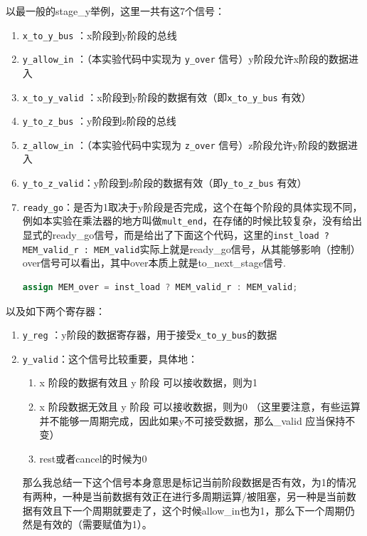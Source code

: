 \documentclass[a4paper]{article}
\begin{document}
以最一般的stage\_y举例，这里一共有这7个信号：
\begin{enumerate}
    \item \texttt{x\_to\_y\_bus} ：x阶段到y阶段的总线
    \item \texttt{y\_allow\_in} ：（本实验代码中实现为 \texttt{y\_over} 信号）y阶段允许x阶段的数据进入
    \item \texttt{x\_to\_y\_valid} ：x阶段到y阶段的数据有效（即\texttt{x\_to\_y\_bus} 有效）
    \item \texttt{y\_to\_z\_bus} ：y阶段到z阶段的总线
    \item \texttt{z\_allow\_in} ：（本实验代码中实现为 \texttt{z\_over} 信号）z阶段允许y阶段的数据进入
    \item \texttt{y\_to\_z\_valid}：y阶段到z阶段的数据有效（即\texttt{y\_to\_z\_bus} 有效）
    \item \texttt{ready\_go}：是否为1取决于y阶段是否完成，这个在每个阶段的具体实现不同，例如本实验在乘法器的地方叫做\texttt{mult\_end}，在存储的时候比较复杂，没有给出显式的ready\_go信号，而是给出了下面这个代码，这里的\texttt{inst\_load ? MEM\_valid\_r : MEM\_valid}实际上就是ready\_go信号，从其能够影响（控制）over信号可以看出，其中over本质上就是to\_next\_stage信号.
    \begin{lstlisting}[language=Verilog]
        assign MEM_over = inst_load ? MEM_valid_r : MEM_valid;
    \end{lstlisting}    
\end{enumerate}
以及如下两个寄存器：
\begin{enumerate}
    \item \texttt{y\_reg} ：y阶段的数据寄存器，用于接受\texttt{x\_to\_y\_bus}的数据
    \item \texttt{y\_valid}：这个信号比较重要，具体地：
    \begin{enumerate}
        \item x 阶段的数据有效且 y 阶段 可以接收数据，则为1
        \item x 阶段数据无效且 y 阶段 可以接收数据，则为0 （这里要注意，有些运算并不能够一周期完成，因此如果y不可接受数据，那么\_valid 应当保持不变）
        \item rest或者cancel的时候为0
    \end{enumerate}
    那么我总结一下这个信号本身意思是标记当前阶段数据是否有效，为1的情况有两种，一种是当前数据有效正在进行多周期运算/被阻塞，另一种是当前数据有效且下一个周期就要走了，这个时候allow\_in也为1，那么下一个周期仍然是有效的（需要赋值为1）。
\end{enumerate}
\end{document}

